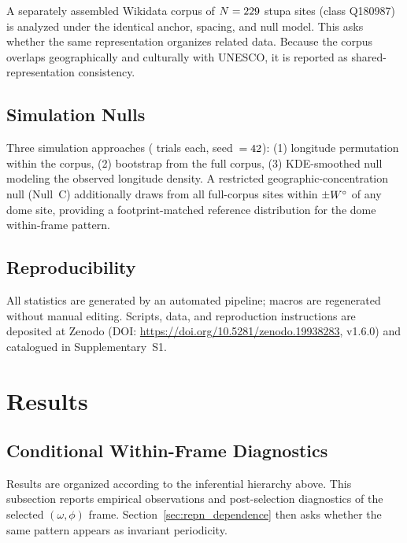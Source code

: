 \documentclass[12pt,a4paper]{article}
\newcommand{\degr}{\ifmmode{^\circ}\else\textdegree{}\fi}
\begin{document}
A separately assembled Wikidata corpus of $N = 229$ stupa sites
(class Q180987) \citep{tenenbaum2026audit} is analyzed under the identical
anchor, spacing, and null model. This asks whether the same representation
organizes related data. Because the corpus overlaps geographically and
culturally with UNESCO, it is reported as shared-representation consistency.

\subsection{Simulation Nulls}

Three simulation approaches (\simNperms{} trials each, seed~$= 42{}$):
(1) longitude permutation within the corpus,
(2) bootstrap from the full corpus,
(3) KDE-smoothed null modeling the observed longitude density.
A restricted geographic-concentration null (Null~C) additionally draws from
all full-corpus sites within $\pm W\degr{}$ of any dome site, providing a
footprint-matched reference distribution for the dome within-frame pattern.

\subsection{Reproducibility}

All statistics are generated by an automated pipeline; macros are regenerated
without manual editing. Scripts, data, and reproduction instructions are
deposited at Zenodo (DOI: \url{https://doi.org/10.5281/zenodo.19938283},
v1.6.0) and catalogued in Supplementary~S1.

\section{Results}
\label{sec:results}

\subsection{Conditional Within-Frame Diagnostics}
\label{sec:results_emergence}

Results are organized according to the inferential hierarchy above. This
subsection reports empirical observations and post-selection diagnostics of
the selected $(\omega,\phi)$ frame. Section~\ref{sec:repn_dependence} then
asks whether the same pattern appears as invariant periodicity.
\end{document}
